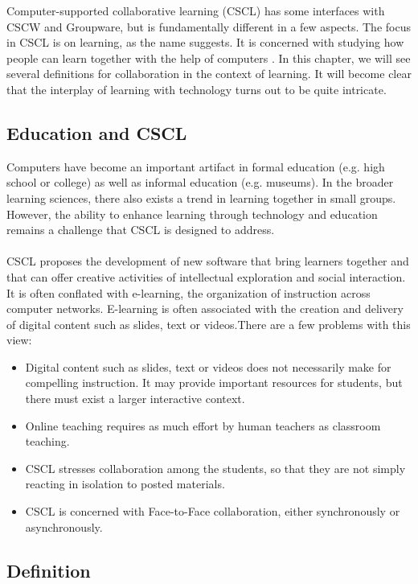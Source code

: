 Computer-supported collaborative learning (CSCL) has some interfaces with CSCW and Groupware, but is fundamentally different in a few aspects. The focus in CSCL is on learning, as the name suggests. It is concerned with studying how people can learn together with the help of computers \cite{CSCLHistory}. In this chapter, we will see several definitions for collaboration in the context of learning. It will become clear that the interplay of learning with technology turns out to be quite intricate. 

\subsection{Education and CSCL}

Computers have become an important artifact in formal education (e.g. high school or college) as well as informal education (e.g. museums). In the broader learning sciences, there also exists a trend in learning together in small groups. However, the ability to enhance learning through technology and education remains a challenge that CSCL is designed to address. 
\\ \\
CSCL proposes the development of new software that bring learners together and that can offer creative activities of intellectual exploration and social interaction. It is often conflated with e-learning, the organization of instruction across computer networks. E-learning is often associated with the creation and delivery of digital content such as slides, text or videos.There are a few problems with this view:

\begin{itemize}
\item{Digital content such as slides, text or videos does not necessarily make for compelling instruction. It may provide important resources for students, but there must exist a larger interactive context.}
\item{Online teaching requires as much effort by human teachers as classroom teaching.}
\item{CSCL stresses collaboration among the students, so that they are not simply reacting in isolation to posted materials.}
\item{CSCL is concerned with Face-to-Face collaboration, either synchronously or asynchronously.}
\end{itemize}

\subsection{Definition}


